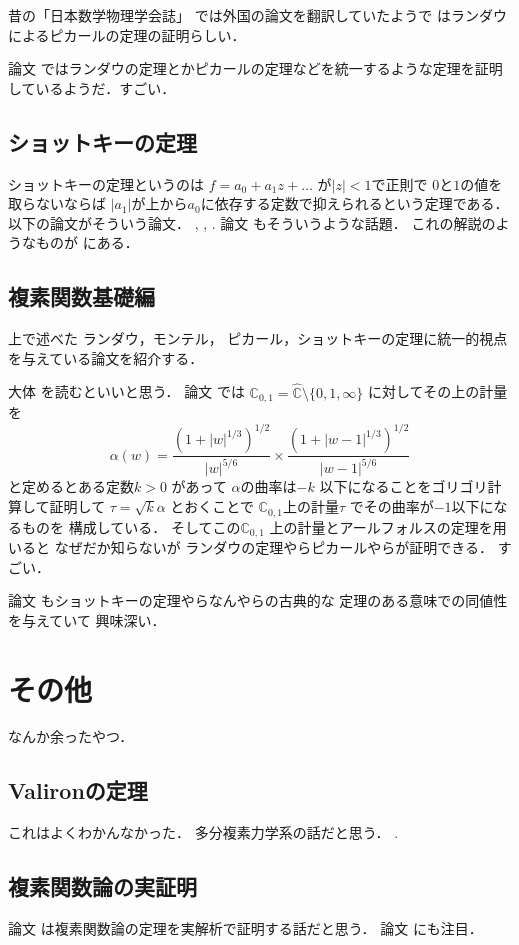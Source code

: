 \documentclass[leqno, a4paper, 12pt]{jsarticle}
\newcommand{\cc}{\mathbb{C}}
\begin{document}
昔の「日本数学物理学会誌」
では外国の論文を翻訳していたようで
\cite{192746}
はランダウによるピカールの定理の証明らしい．

論文
\cite{MR1546112}
ではランダウの定理とかピカールの定理などを統一するような定理を証明しているようだ．すごい．


\subsection{ショットキーの定理}
ショットキーの定理というのは
$f=a_{0}+a_{1}z+\dots$
が$|z|<1$で正則で
$0$と$1$の値を取らないならば
$|a_{1}|$が上から$a_{0}$に依存する定数で抑えられるという定理である．
以下の論文がそういう論文．
\cite{MR0021590}, 
\cite{MR0066460}, 
\cite{MR0575385}. 
論文
\cite{MR1574949}
もそういうような話題．
これの解説のようなものが
\cite{1927224}
にある．


\subsection{複素関数基礎編}
上で述べた
ランダウ，モンテル，
ピカール，ショットキーの定理に統一的視点を与えている論文を紹介する．

大体
\cite{MR0725266}
を読むといいと思う．
論文
\cite{MR0725266}
では
$\cc_{0, 1}=\hat{\cc}\setminus \{0, 1, \infty\}$
に対してその上の計量を
\[
\alpha(w)=\frac{(1+|w|^{1/3})^{1/2}}{|w|^{5/6}}
\times \frac{(1+|w-1|^{1/3})^{1/2}}{|w-1|^{5/6}}
\]
と定めるとある定数$k>0$
があって
$\alpha$の曲率は$-k$
以下になることをゴリゴリ計算して証明して
$\tau=\sqrt{k}\alpha$
とおくことで
$\cc_{0, 1}$上の計量$\tau$
でその曲率が$-1$以下になるものを
構成している．
そしてこの$\cc_{0, 1}$
上の計量とアールフォルスの定理を用いると
なぜだか知らないが
ランダウの定理やらピカールやらが証明できる．
すごい．

論文
\cite{MR0718986}
もショットキーの定理やらなんやらの古典的な
定理のある意味での同値性を与えていて
興味深い．

\section{その他}
なんか余ったやつ．

\subsection{Valironの定理}
これはよくわかんなかった．
多分複素力学系の話だと思う．
\cite{MR2058109}. 


\subsection{複素関数論の実証明}
論文\cite{MR0328028}
は複素関数論の定理を実解析で証明する話だと思う．
論文
\cite{MR2827550}
にも注目．
\end{document}
